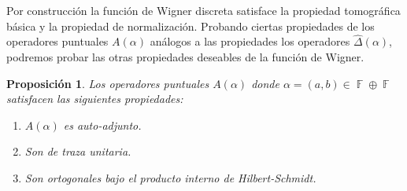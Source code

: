 \documentclass[a4paper]{report}
\DeclareMathOperator{\F}{\mathbb{F}}
\newtheorem{proposition}{Proposición}
\begin{document}
  Por construcción la función de Wigner discreta
  satisface la propiedad tomográfica básica y la propiedad
  de normalización. Probando ciertas propiedades de los
  operadores puntuales $A(\alpha)$ análogos a las
  propiedades los operadores $\hat \Delta(\alpha)$, podremos
  probar las otras propiedades deseables de la función de
  Wigner.
  \begin{proposition}
    \label{prop:point_props}
    Los operadores puntuales $A(\alpha)$ donde $\alpha =
    (a,b) \in \F \oplus \F$ satisfacen las siguientes
    propiedades:
    \begin{enumerate}
      \item $A(\alpha)$ es auto-adjunto.
      \item Son de traza unitaria.
      \item Son ortogonales bajo el producto interno de
        Hilbert-Schmidt.
    \end{enumerate}
  \end{proposition}
\end{document}

